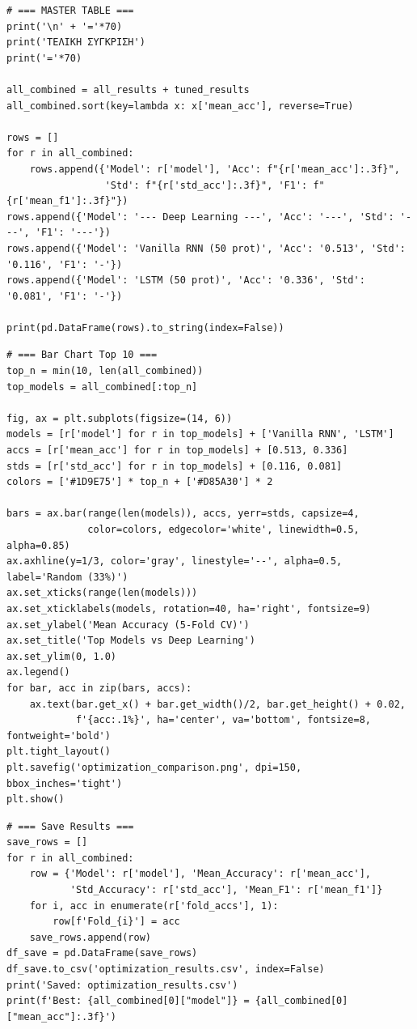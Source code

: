 \begin{lstlisting}
# === MASTER TABLE ===
print('\n' + '='*70)
print('ΤΕΛΙΚΗ ΣΥΓΚΡΙΣΗ')
print('='*70)
 
all_combined = all_results + tuned_results
all_combined.sort(key=lambda x: x['mean_acc'], reverse=True)
 
rows = []
for r in all_combined:
    rows.append({'Model': r['model'], 'Acc': f"{r['mean_acc']:.3f}",
                 'Std': f"{r['std_acc']:.3f}", 'F1': f"{r['mean_f1']:.3f}"})
rows.append({'Model': '--- Deep Learning ---', 'Acc': '---', 'Std': '---', 'F1': '---'})
rows.append({'Model': 'Vanilla RNN (50 prot)', 'Acc': '0.513', 'Std': '0.116', 'F1': '-'})
rows.append({'Model': 'LSTM (50 prot)', 'Acc': '0.336', 'Std': '0.081', 'F1': '-'})
 
print(pd.DataFrame(rows).to_string(index=False))
\end{lstlisting}
 
\begin{lstlisting}
# === Bar Chart Top 10 ===
top_n = min(10, len(all_combined))
top_models = all_combined[:top_n]
 
fig, ax = plt.subplots(figsize=(14, 6))
models = [r['model'] for r in top_models] + ['Vanilla RNN', 'LSTM']
accs = [r['mean_acc'] for r in top_models] + [0.513, 0.336]
stds = [r['std_acc'] for r in top_models] + [0.116, 0.081]
colors = ['#1D9E75'] * top_n + ['#D85A30'] * 2
 
bars = ax.bar(range(len(models)), accs, yerr=stds, capsize=4,
              color=colors, edgecolor='white', linewidth=0.5, alpha=0.85)
ax.axhline(y=1/3, color='gray', linestyle='--', alpha=0.5, label='Random (33%)')
ax.set_xticks(range(len(models)))
ax.set_xticklabels(models, rotation=40, ha='right', fontsize=9)
ax.set_ylabel('Mean Accuracy (5-Fold CV)')
ax.set_title('Top Models vs Deep Learning')
ax.set_ylim(0, 1.0)
ax.legend()
for bar, acc in zip(bars, accs):
    ax.text(bar.get_x() + bar.get_width()/2, bar.get_height() + 0.02,
            f'{acc:.1%}', ha='center', va='bottom', fontsize=8, fontweight='bold')
plt.tight_layout()
plt.savefig('optimization_comparison.png', dpi=150, bbox_inches='tight')
plt.show()
\end{lstlisting}
 
\begin{lstlisting}
# === Save Results ===
save_rows = []
for r in all_combined:
    row = {'Model': r['model'], 'Mean_Accuracy': r['mean_acc'],
           'Std_Accuracy': r['std_acc'], 'Mean_F1': r['mean_f1']}
    for i, acc in enumerate(r['fold_accs'], 1):
        row[f'Fold_{i}'] = acc
    save_rows.append(row)
df_save = pd.DataFrame(save_rows)
df_save.to_csv('optimization_results.csv', index=False)
print('Saved: optimization_results.csv')
print(f'Best: {all_combined[0]["model"]} = {all_combined[0]["mean_acc"]:.3f}')
\end{lstlisting}
 
